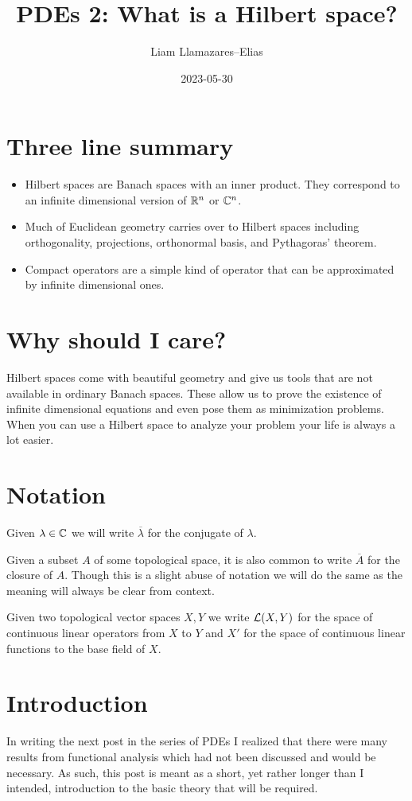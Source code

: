 \documentclass[
    a4paper,
    DIV=14,
    abstract=true,
    numbers=noenddot
]{scrartcl}
\begin{document}
	\title{PDEs 2: What is a Hilbert space?}
	\author{Liam Llamazares--Elias}
	\date{2023-05-30}
	\maketitle
	\section{ Three line summary}
	\begin{itemize}
		\item Hilbert spaces are Banach spaces with an inner product. They correspond to an infinite dimensional version of $\mathbb{R}^n$ or $\mathbb{C}^n$.
		\item Much of Euclidean geometry carries over to Hilbert spaces including orthogonality, projections, orthonormal basis, and Pythagoras' theorem.
		\item Compact operators are a simple kind of operator that can be approximated by infinite dimensional ones.
	\end{itemize}
	\section{Why should I care?}
	Hilbert spaces come with beautiful geometry and give us tools that are not available in ordinary Banach spaces. These allow us to prove the existence of infinite dimensional equations and even pose them as minimization problems. When you can use a Hilbert space to analyze your problem your life is always a lot easier.
	\section{Notation}
	Given $\lambda \in \mathbb{C}$ we will write $\overline{\lambda }$ for the conjugate of $\lambda $.

	Given a subset $A$ of some topological space, it is also common to write  $\overline{A}$ for the closure of $A$. Though this is a slight abuse of notation we will do the same as the meaning will always be clear from context.

	Given two topological vector spaces $X, Y$ we write  $\mathcal{L}(X, Y)$ for the space of continuous linear operators from $X$ to  $Y$ and $X'$ for the space of continuous linear functions to the base field of $X$.


	\section{Introduction}
	In writing the next post in the series of PDEs I realized that there were many results from functional analysis which had not been discussed and would be necessary. As such, this post is meant as a short, yet rather longer than I intended, introduction to the basic theory that will be required.
\end{document}
